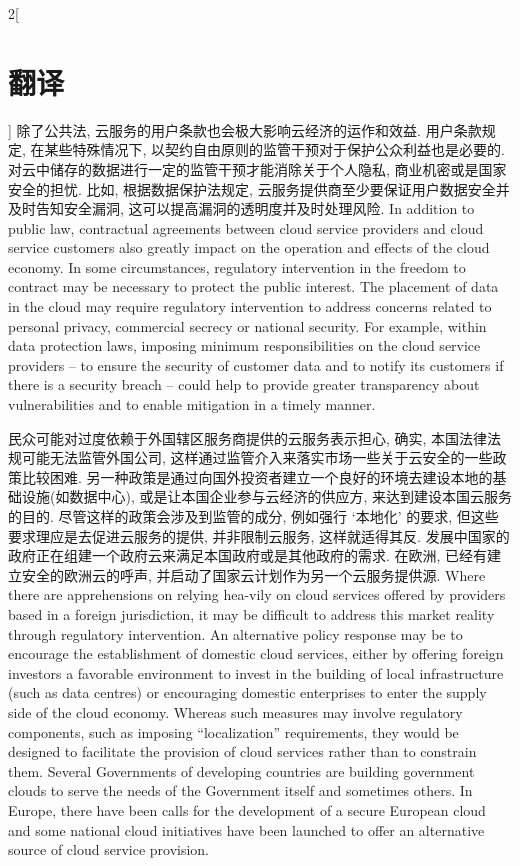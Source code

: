 \documentclass[a4paper, UTF8, 12pt]{article}
\begin{document}
\begin{paracol}{2}[\section{翻译}]
    \switchcolumn*
    除了公共法, 云服务的用户条款也会极大影响云经济的运作和效益. 用户条款规定, 在某些特殊情况下, 以契约自由原则的监管干预对于保护公众利益也是必要的. 对云中储存的数据进行一定的监管干预才能消除关于个人隐私, 商业机密或是国家安全的担忧. 比如, 根据数据保护法规定, 云服务提供商至少要保证用户数据安全并及时告知安全漏洞, 这可以提高漏洞的透明度并及时处理风险. 
    \switchcolumn
    In addition to public law, contractual agreements between cloud service providers and cloud service customers also greatly impact on the operation and effects of the cloud economy. In some circumstances, regulatory intervention in the freedom to contract may be necessary to protect the public interest. The placement of data in the cloud may require regulatory intervention to address concerns related to personal privacy, commercial secrecy or national security. For example, within data protection laws, imposing minimum responsibilities on the cloud service providers – to ensure the security of customer data and to notify its customers if there is a security breach – could help to provide greater transparency about vulnerabilities and to enable mitigation in a timely manner. 

    \switchcolumn*
    民众可能对过度依赖于外国辖区服务商提供的云服务表示担心, 确实, 本国法律法规可能无法监管外国公司, 这样通过监管介入来落实市场一些关于云安全的一些政策比较困难. 另一种政策是通过向国外投资者建立一个良好的环境去建设本地的基础设施(如数据中心), 或是让本国企业参与云经济的供应方, 来达到建设本国云服务的目的. 尽管这样的政策会涉及到监管的成分, 例如强行 `本地化' 的要求, 但这些要求理应是去促进云服务的提供, 并非限制云服务, 这样就适得其反. 发展中国家的政府正在组建一个政府云来满足本国政府或是其他政府的需求. 在欧洲, 已经有建立安全的欧洲云的呼声, 并启动了国家云计划作为另一个云服务提供源.
    \switchcolumn
    Where there are apprehensions on relying hea-vily on cloud services offered by providers based in a foreign jurisdiction, it may be difficult to address this market reality through regulatory intervention. An alternative policy response may be to encourage the establishment of domestic cloud services, either by offering foreign investors a favorable environment to invest in the building of local infrastructure (such as data centres) or encouraging domestic enterprises to enter the supply side of the cloud economy. Whereas such measures may involve regulatory components, such as imposing “localization” requirements, they would be designed to facilitate the provision of cloud services rather than to constrain them. Several Governments of developing countries are building government clouds to serve the needs of the Government itself and sometimes others. In Europe, there have been calls for the development of a secure European cloud and some national cloud initiatives have been launched to offer an alternative source of cloud service provision. 


\end{paracol}
\end{document}
